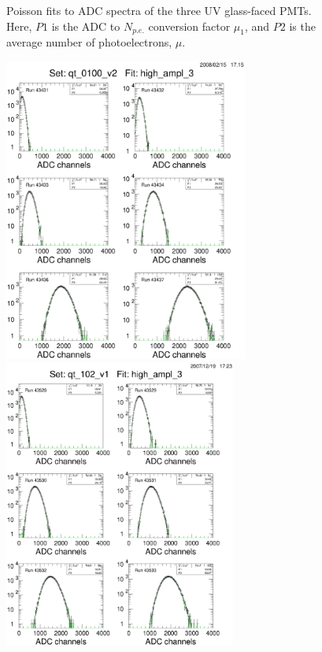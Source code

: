 \begin{figure}
\begin{centering}
\vspace{0.5cm}
\caption{\small{Poisson fits to ADC spectra of the three UV glass-faced 
PMTs.  Here, $P1$ is the ADC to $N_{p.e.}$ conversion factor $\mu_1$, and 
$P2$ is the average number of photoelectrons, $\mu$.}}
\label{poisson_uvglass}
\end{centering}
\end{figure}

\begin{figure}
\vspace{0.5cm}
\begin{centering}
\includegraphics[height=10.0cm]{PMT-studies/qt_0100_v2_fits.eps}
\end{centering}
\begin{centering}
\includegraphics[height=9.5cm]{PMT-studies/qt_0102_v1_fits.eps}

\end{centering}
\end{figure}
